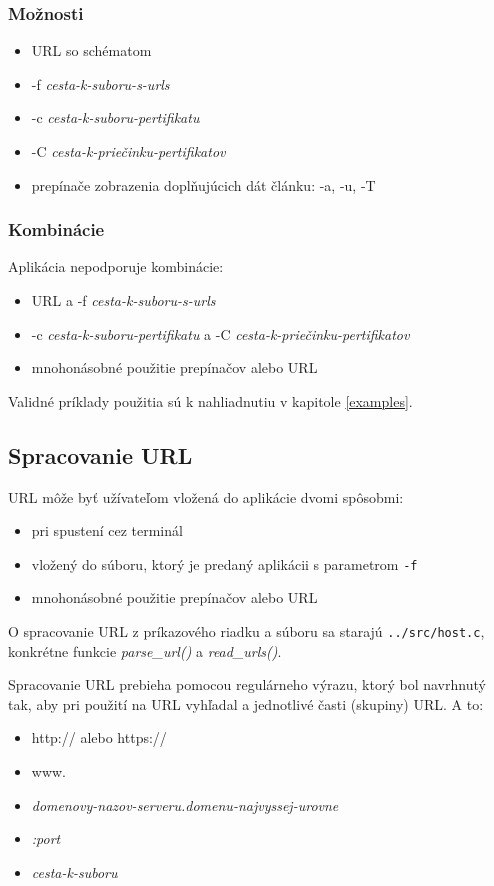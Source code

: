 \subsubsection{Možnosti}
\begin{itemize}
  \item{URL so schématom}
  \item{-f {\it cesta-k-suboru-s-urls}}
  \item{-c {\it cesta-k-suboru-pertifikatu}}
  \item{-C {\it cesta-k-priečinku-pertifikatov}}
  \item{prepínače zobrazenia doplňujúcich dát článku: -a, -u, -T}
\end{itemize}
\subsubsection{Kombinácie}
Aplikácia nepodporuje kombinácie:
\begin{itemize}
  \item{URL a -f {\it cesta-k-suboru-s-urls}}
  \item{-c {\it cesta-k-suboru-pertifikatu} a -C {\it cesta-k-priečinku-pertifikatov}}
  \item{mnohonásobné použitie prepínačov alebo URL}
\end{itemize}

Validné príklady použitia sú k nahliadnutiu v kapitole \ref{examples}.

\subsection*{Spracovanie URL}
URL môže byť užívateľom vložená do aplikácie dvomi spôsobmi:
\begin{itemize}
  \item{pri spustení cez terminál}
  \item{vložený do súboru, ktorý je predaný aplikácii s parametrom {\tt -f}}
  \item{mnohonásobné použitie prepínačov alebo URL}
\end{itemize}

O spracovanie URL z príkazového riadku a súboru sa starajú {\tt ../src/host.c}, konkrétne funkcie {\it parse\_url()} a {\it read\_urls()}. 

Spracovanie URL prebieha pomocou regulárneho výrazu\cite{regexMan}, ktorý bol navrhnutý tak, aby pri použití na URL vyhľadal a jednotlivé časti (skupiny) URL. A to:
\begin{itemize}
  \item{http:// alebo https://}
  \item{www.}
  \item{{\it domenovy-nazov-serveru.domenu-najvyssej-urovne}}
  \item{{\it :port}}
  \item{{\it cesta-k-suboru}}
\end{itemize}

